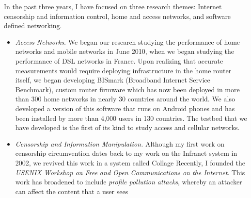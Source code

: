 \documentclass{article}
\begin{document}
In the past three years, I have focused on three research themes:
Internet censorship and information control, home and access networks,
and software defined networking.  
\begin{itemize}
\itemsep=-1pt
\item {\em Access Networks.}  We began our research studying
the performance of home networks and mobile networks in June 2010, when
we began studying the performance of DSL networks in France.  Upon
realizing that accurate measurements would require deploying
infrastructure in the home router itself, we began developing BISmark
(Broadband Internet Service Benchmark), custom router firmware which has
now been deployed in more than 300 home networks in nearly 30 countries
around the world.  We also developed a version of this software that
runs on Android phones and has been installed by more than 4,000 users
in 130 countries.  
The testbed that we have developed is the first of
its kind to study access and cellular networks.
%
\item {\em Censorship and Information Manipulation.} Although my first
work on censorship circumvention dates back to my work on the Infranet
system in 2002, we revived this work in a system called Collage
Recently, I founded the {\em
USENIX Workshop on Free and Open Communications on the Internet}.
This work has broadened to include {\em profile pollution
attacks}, whereby an attacker can affect the content that a user sees

\end{itemize}
\end{document}
